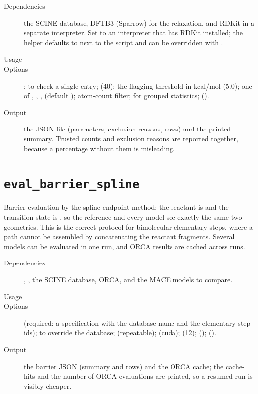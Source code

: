 \begin{description}
  \item[Dependencies] the SCINE database, DFTB3 (Sparrow) for the
        relaxation, and RDKit in a separate interpreter.  Set
         to an interpreter that has RDKit
        installed; the helper defaults to  next to
        the script and can be overridden with .
  \item[Usage] 
  \item[Options] ;  to check a single entry;
         (40);  the flagging threshold in
        kcal/mol (5.0);  one of , ,
        ,  (default ); 
        atom-count filter;  for grouped statistics;
         ().
  \item[Output] the JSON file (parameters, exclusion reasons, rows) and the
        printed summary.  Trusted counts and exclusion reasons are reported
        together, because a percentage without them is misleading.
\end{description}

\section{\texttt{eval\_barrier\_spline}}

Barrier evaluation by the spline-endpoint method: the reactant is
 and the transition state is
, so the reference and every model see
exactly the same two geometries.  This is the correct protocol for
bimolecular elementary steps, where a path cannot be assembled by
concatenating the reactant fragments.  Several models can be evaluated in one
run, and ORCA results are cached across runs.

\begin{description}
  \item[Dependencies] , , the SCINE database,
        ORCA, and the MACE models to compare.
  \item[Usage] 
  \item[Options]  (required: a specification with the
        database name and the elementary-step ids);  to override
        the database;  (repeatable);
         (cuda);  (12); 
        (); 
        ().
  \item[Output] the barrier JSON (summary and rows) and the ORCA cache; the
        cache-hits and the number of ORCA evaluations are printed, so a
        resumed run is visibly cheaper.
\end{description}

